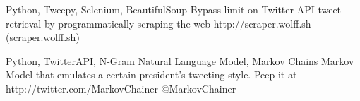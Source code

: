 
\begin{projects}
        
    {Python, Tweepy, Selenium, BeautifulSoup}
    {Bypass limit on Twitter API tweet retrieval by programmatically scraping the web}
    {http://scraper.wolff.sh}
    {(scraper.wolff.sh)}
    
    
    {Python, TwitterAPI, N-Gram Natural Language Model, Markov Chains}
    {Markov Model that emulates a certain president's tweeting-style. Peep it at}
    {http://twitter.com/MarkovChainer}
    {@MarkovChainer}
    
    
    
\end{projects}